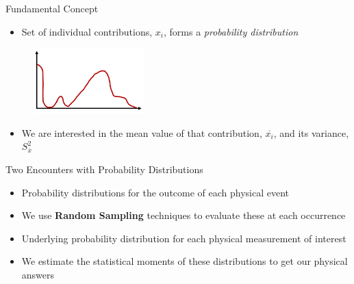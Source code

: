 \documentclass[xcolor=x11names,compress]{beamer}
\renewcommand{\(}{\begin{columns}}
\renewcommand{\)}{\end{columns}}
\newcommand{\<}[1]{\begin{column}{#1}}
\renewcommand{\>}{\end{column}}
\begin{document}
\begin{frame}{Fundamental Concept}

\begin{itemize}
  \item Set of individual contributions, ${x_i}$,
forms a \textit{probability distribution}
\end{itemize}
  	\begin{figure}
  	\begin{center}
  		\includegraphics[height=1in,clip]{../figs/pdf}
	\end{center}
  	\end{figure}

\begin{itemize}
  \item We are interested in the mean value of that contribution, $\overline{x_i}$, and its variance, $S_{\overline{x}}^2$
\end{itemize}

\end{frame}


\begin{frame}{Two Encounters with Probability Distributions}

\begin{itemize}
    \item Probability distributions for the outcome
of each physical event
    \item We use \textbf{Random Sampling} techniques to
evaluate these at each occurrence
    \item Underlying probability distribution for
each physical measurement of interest
    \item We estimate the statistical moments of
these distributions to get our physical
answers
\end{itemize}
\end{frame}
\end{document}
